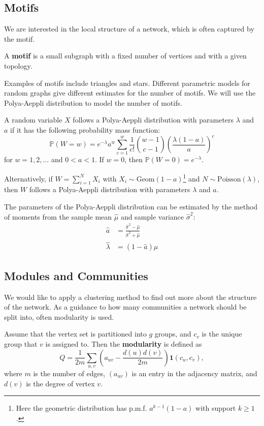 \documentclass{article}
\begin{document}
\subsection{Motifs}

We are interested in the local structure of a network, which is often captured by the motif.
\begin{definition}
    A \textbf{motif} is a small subgraph with a fixed number of vertices and with
    a given topology.
\end{definition}

Examples of motifs include triangles and stars. Different parametric models for random graphs give different estimates for the number of motifs. We will use the Polya-Aeppli distribution to model the number of motifs.  

\begin{definition}
    A random variable $X$ follows a Polya-Aeppli distribution with parameters $\lambda$ and $a$ if it has the following probability mass function:
    \begin{equation*}
        \mathbb{P}(W=w)=e^{-\lambda}a^{w}\sum_{c=1}^{w}\frac{1}{c!}\binom{w-1}{c-1}\left(\frac{\lambda(1-a)}{a}\right)^{c}
    \end{equation*}
    for $w=1,2,\ldots$ and $0<a<1$. If $w=0$, then $\mathbb{P}(W=0)=e^{-\lambda}$.
\end{definition}

Alternatively, if $W=\sum_{i=1}^{N}X_{i}$ with $X_{i}\sim\mathrm{Geom}(1-a)$\footnote{Here the geometric distribution has p.m.f. $a^{k-1}(1-a)$ with support $k\geq 1$. } and $N\sim \mathrm{Poisson}(\lambda)$, then $W$ follows a Polya-Aeppli distribution with parameters $\lambda$ and $a$.  

The parameters of the Polya-Aeppli distribution can be estimated by the method of moments from the sample mean $\hat{\mu}$ and sample variance $\hat{\sigma}^2$:
\begin{align*}
    \hat{a} &= \frac{\hat{\sigma}^2 - \hat{\mu}}{\hat{\sigma}^2+\hat{\mu}}\\
    \hat{\lambda} &= (1-\hat{a})\hat{\mu}
\end{align*}


\subsection{Modules and Communities}
We would like to apply a clustering method to find out more about the structure of the network. As a guidance to how many communities a network should be split into, often modularity is used.  
\begin{definition}
    Assume that the vertex set is partitioned into \( g \) groups, and
\( c_v \) is the unique group that \( v \) is assigned to. 
Then the \textbf{modularity} is defined as
\[
Q = \frac{1}{2m} \sum_{u,v} \left( a_{uv} - \frac{d(u)d(v)}{2m} \right) \mathbf{1}(c_u, c_v),
\]
where \( m \) is the number of edges, \((a_{uv}) \) is an entry in the adjacency matrix, and \( d(v) \)
is the degree of vertex \( v \).
\end{definition}
\end{document}
